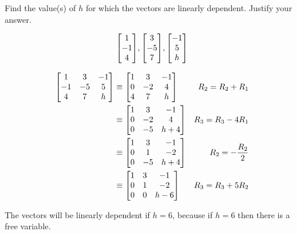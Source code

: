 \documentclass{../mathhomework}
\newenvironment{Mat}{\begin{bmatrix}}{\end{bmatrix}}
\begin{document}
\begin{problem}[1.7\#11]
    Find the value(s) of $h$ for which the vectors are linearly dependent. Justify your answer.

    \begin{equation*}
        \begin{Mat}
            1 \\ -1 \\ 4
        \end{Mat},
        \begin{Mat}
            3 \\ -5 \\ 7
        \end{Mat},
        \begin{Mat}
            -1 \\ 5 \\ h
        \end{Mat}
    \end{equation*}

    \begin{solution}
        \begin{align*}
            \begin{Mat}
                1 & 3 & -1 \\ 
                -1 & -5 & 5 \\ 
                4 & 7 & h
            \end{Mat} & \equiv
            \begin{Mat}
                1 & 3 & -1 \\ 
                0 & -2 & 4 \\ 
                4 & 7 & h
            \end{Mat} & R_2 = R_2 + R_1 \\ & \equiv
            \begin{Mat}
                1 & 3 & -1 \\ 
                0 & -2 & 4 \\ 
                0 & -5 & h + 4
            \end{Mat} & R_3 = R_3 - 4R_1 \\ & \equiv
            \begin{Mat}
                1 & 3 & -1 \\ 
                0 & 1 & -2 \\ 
                0 & -5 & h + 4
            \end{Mat} & R_2 = -\frac{R_2}{2} \\ & \equiv
            \begin{Mat}
                1 & 3 & -1 \\ 
                0 & 1 & -2 \\ 
                0 & 0 & h - 6
            \end{Mat} & R_3 = R_3 + 5R_2
        \end{align*}

        The vectors will be linearly dependent if $h = 6$, because if $h = 6$ then there is a free variable.
    \end{solution}
\end{problem}
\end{document}
